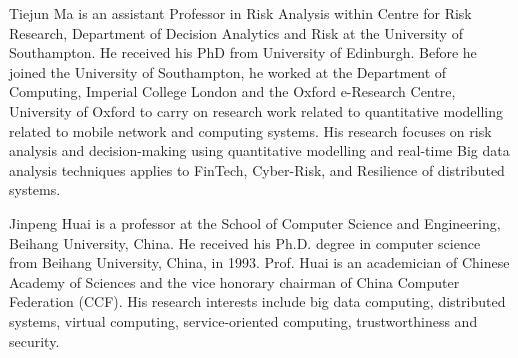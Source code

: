 \vspace{-6ex}
\begin{IEEEbiography}{Tiejun Ma} is an assistant Professor in Risk Analysis within Centre for Risk Research, Department of Decision Analytics and Risk at the University of Southampton. He received his PhD from University of Edinburgh. Before he joined the University of Southampton, he worked at the Department of Computing, Imperial College London and the Oxford e-Research Centre, University of Oxford to carry on research work related to quantitative modelling related to mobile network and computing systems. His research focuses on risk analysis and decision-making using quantitative modelling and real-time Big data analysis techniques applies to FinTech, Cyber-Risk, and Resilience of distributed systems.
\end{IEEEbiography}
\vspace{-6ex}
\begin{IEEEbiography}{Jinpeng Huai} is a professor at the School of Computer Science and Engineering, Beihang University, China. He received his Ph.D. degree in computer science from Beihang University, China, in 1993. Prof. Huai is an academician of Chinese Academy of Sciences and the vice honorary chairman of China Computer Federation (CCF). His research interests include big data computing, distributed systems, virtual computing, service-oriented computing, trustworthiness and security.
\end{IEEEbiography}
